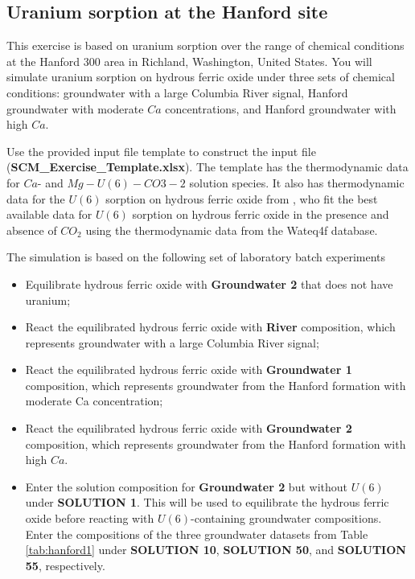 \subsection{Uranium sorption at the Hanford site}

This exercise is based on uranium sorption over the range of chemical 
conditions at the Hanford 300 area in Richland, Washington, United States.  
You will simulate uranium sorption on hydrous ferric oxide under three 
sets of chemical conditions: groundwater with a large Columbia River signal, 
Hanford groundwater with moderate $Ca$ concentrations, 
and Hanford groundwater with high $Ca$.

Use the provided input file template to construct the 
input file ({\color{red}\textbf{SCM\_Exercise\_Template.xlsx}}).  
The template has the thermodynamic data for $Ca$- and $Mg-U(6)-CO3-2$ solution species.  
It also has thermodynamic data for the $U(6)$ sorption on hydrous ferric 
oxide from \cite{mahoney_2009}, 
who fit the best available data for $U(6)$ sorption 
on hydrous ferric oxide in the presence and absence of 
$CO_2$ using the thermodynamic data from the Wateq4f database.  

The simulation is based on the following set of laboratory batch experiments
\begin{itemize}
\item Equilibrate hydrous ferric oxide with {\color{red}\textbf{Groundwater 2}} that does not have uranium;
\item React the equilibrated hydrous ferric oxide with {\color{red}\textbf{River}} 
composition, which represents groundwater with a large Columbia River signal;
\item React the equilibrated hydrous ferric oxide with {\color{red}\textbf{Groundwater 1}} 
composition, which represents groundwater from the Hanford formation with moderate Ca concentration;
\item React the equilibrated hydrous ferric oxide with {\color{red}\textbf{Groundwater 2}} 
composition, which represents groundwater from the Hanford formation with high $Ca$.
\item Enter the solution composition for {\color{red}\textbf{Groundwater 2}} 
but without $U(6)$ under {\color{red}\textbf{SOLUTION 1}}.  
This will be used to equilibrate the hydrous ferric oxide before reacting 
with $U(6)$-containing groundwater compositions.  
Enter the compositions of the three groundwater datasets from 
Table \ref{tab:hanford1}
under {\color{red}\textbf{SOLUTION 10}}, 
{\color{red}\textbf{SOLUTION 50}}, 
and {\color{red}\textbf{SOLUTION 55}}, respectively.  
\end{itemize} 

